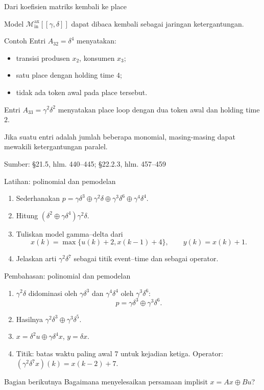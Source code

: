 \documentclass[aspectratio=169,11pt]{beamer}
\newcommand{\source}[1]{%
    \vfill
    \hfill{\tiny\color{gray}Sumber: #1}
}
\newcommand{\D}{\mathcal{M}_{\mathrm{in}}^{\mathrm{ax}}[[\gamma,\delta]]}
\begin{document}
\begin{frame}{Dari koefisien matriks kembali ke place}

Model $\D$ dapat dibaca kembali sebagai jaringan ketergantungan.
\begin{exampleblock}{Contoh}
Entri $A_{32}=\delta^4$ menyatakan:
\begin{itemize}
\item transisi produsen $x_2$, konsumen $x_3$;
\item satu place dengan holding time $4$;
\item tidak ada token awal pada place tersebut.
\end{itemize}
\end{exampleblock}
Entri $A_{33}=\gamma^2\delta^2$ menyatakan place loop dengan dua token awal dan holding time $2$.
\medskip

Jika suatu entri adalah jumlah beberapa monomial, masing-masing dapat mewakili ketergantungan paralel.

\source{\S21.5, hlm. 440--445; \S22.2.3, hlm. 457--459}
\end{frame}
\begin{frame}{Latihan: polinomial dan pemodelan}


\begin{enumerate}
\item Sederhanakan
$p=\gamma\delta^3\oplus\gamma^2\delta
\oplus\gamma^3\delta^6\oplus\gamma^4\delta^4$.
\item Hitung $(\delta^2\oplus\gamma\delta^4)\gamma^2\delta$.
\item Tuliskan model gamma--delta dari
\[
x(k)=\max\{u(k)+2,x(k-1)+4\},\qquad y(k)=x(k)+1.
\]
\item Jelaskan arti $\gamma^2\delta^7$ sebagai titik event--time dan sebagai operator.
\end{enumerate}
 


\end{frame}
\begin{frame}{Pembahasan: polinomial dan pemodelan}


\begin{enumerate}
\item $\gamma^2\delta$ didominasi oleh $\gamma\delta^3$ dan
$\gamma^4\delta^4$ oleh $\gamma^3\delta^6$:
\[
p=\gamma\delta^3\oplus\gamma^3\delta^6.
\]
\item Hasilnya $\gamma^2\delta^3\oplus\gamma^3\delta^5$.
\item $x=\delta^2u\oplus\gamma\delta^4x$, $y=\delta x$.
\item Titik: batas waktu paling awal $7$ untuk kejadian ketiga.
Operator: $(\gamma^2\delta^7x)(k)=x(k-2)+7$.
\end{enumerate}
\begin{block}{Bagian berikutnya}
Bagaimana menyelesaikan persamaan implisit $x=Ax\oplus Bu$?
\end{block}


\end{frame}
\end{document}
